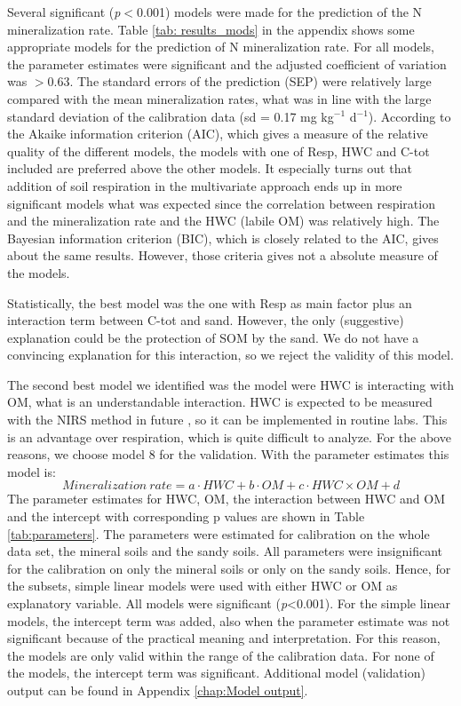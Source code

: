 \documentclass[10pt,twoside,dutch,english]{report}
\begin{document}
Several significant  (\textit{p}$<$0.001) models were made for the prediction of the N mineralization rate. Table \ref{tab: results_mods} in the appendix shows some appropriate models for the prediction of N mineralization rate. For all models, the parameter estimates were significant and the adjusted coefficient of variation was $>$0.63. The standard errors of the prediction (SEP) were  relatively large compared with the mean mineralization rates, what was in line with the large standard deviation of the calibration data (sd = 0.17 mg kg$^{-1}$ d$^{-1}$).  According to the Akaike information criterion (AIC), which gives a measure of the relative quality of the different models, the models with one of Resp, HWC and C-tot included are preferred above the other models.  It especially turns out that addition of soil respiration in the multivariate approach ends up in more significant models what was expected since the correlation between respiration and the mineralization rate and the HWC (labile OM) was relatively high. The Bayesian information criterion (BIC), which is closely related to the AIC, gives about the same results. However, those criteria gives not a absolute measure of the models. 

Statistically, the best model was the one with Resp as main factor plus an interaction term between C-tot and sand. However, the only (suggestive) explanation could be the protection of SOM by the sand.  We do not have a convincing explanation for this interaction, so we reject the validity of this model. 

 The second best model we identified was the model were HWC is interacting with OM, what is an understandable interaction.  HWC is expected to be measured with the NIRS method in future \citep{Vasques2009}, so it can be implemented in routine labs. This is an advantage over respiration, which is quite difficult to analyze. For the above reasons, we choose model 8 for the validation. With the parameter estimates this model is: 
\begin{equation} %
Mineralization\  rate = a\cdot HWC +b\cdot OM +c\cdot HWC\times OM + d
\label{eq: model}
\end{equation}
The parameter estimates for HWC, OM, the interaction between HWC and OM and the intercept with corresponding p values are shown in Table \ref{tab:parameters}. The parameters were estimated for calibration on the whole data set, the mineral soils and the sandy soils. All parameters were insignificant for the  calibration on only the mineral soils or only on the sandy soils. Hence, for the subsets, simple linear models were used with either HWC or OM as explanatory variable. All models were significant (\textit{p}<0.001). For the simple linear models, the intercept term was added, also when the parameter estimate was not significant because of the practical meaning and interpretation. For this reason, the models are only valid within the range of the calibration data.  For none of the models, the intercept term was significant. Additional model (validation) output can be found in Appendix \ref{chap:Model output}.  
\end{document}
